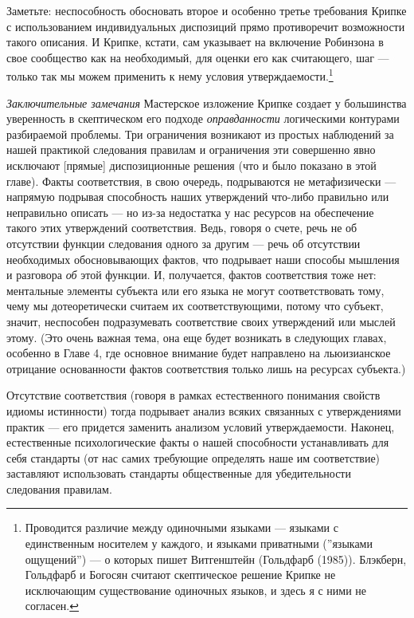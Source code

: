 \documentclass[11pt]{book}
\begin{document}
Заметьте: неспособность обосновать второе и особенно третье требования Крипке с использованием индивидуальных диспозиций прямо противоречит возможности такого описания. И Крипке, кстати, сам указывает на включение Робинзона в свое сообщество как на необходимый, для оценки его как считающего, шаг --- только так мы можем применить к нему условия утверждаемости.\footnote{Проводится различие между одиночными языками --- языками с единственным носителем у каждого, и языками приватными (''языками ощущений'') --- о которых пишет Витгенштейн (Гольдфарб (1985)). Блэкберн, Гольдфарб и Богосян считают скептическое решение Крипке не исключающим существование одиночных языков, и здесь я с ними не согласен.}

\textit{Заключительные замечания} \quad Мастерское изложение Крипке создает у большинства уверенность в скептическом его подходе \textit{оправданности} логическими контурами разбираемой проблемы. Три ограничения возникают из простых наблюдений за нашей практикой следования правилам и ограничения эти совершенно явно исключают [прямые] диспозиционные решения (что и было показано в этой главе). Факты соответствия, в свою очередь, подрываются не метафизически --- напрямую подрывая способность наших утверждений что-либо правильно или неправильно описать --- но из-за недостатка у нас ресурсов на обеспечение такого этих утверждений соответствия. Ведь, говоря о счете, речь не об отсутствии функции следования одного за другим --- речь об отсутствии необходимых обосновывающих фактов, что подрывает наши способы мышления и разговора \textit{об} этой функции. И, получается, фактов соответствия тоже нет: ментальные элементы субъекта или его языка не могут соответствовать тому, чему мы дотеоретически считаем их соответствующими, потому что субъект, значит, неспособен подразумевать соответствие своих утверждений или мыслей этому. (Это очень важная тема, она еще будет возникать в следующих главах, особенно в Главе 4, где основное внимание будет направлено на льюизианское отрицание основанности фактов соответствия только лишь на ресурсах субъекта.)

Отсутствие соответствия (говоря в рамках естественного понимания свойств идиомы истинности) тогда подрывает анализ всяких связанных с утверждениями практик --- его придется заменить анализом условий утверждаемости. Наконец, естественные психологические факты о нашей способности устанавливать для себя стандарты (от нас самих требующие определять наше им соответствие) заставляют использовать стандарты общественные для убедительности следования правилам.
\end{document}
